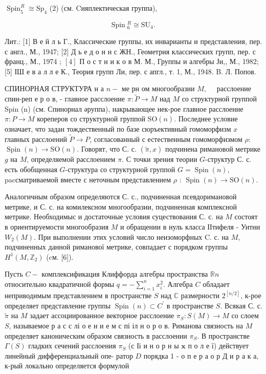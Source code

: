 \documentclass[10pt]{article}
\begin{document}
$\operatorname{Spin}_{5}^{R} \cong \mathrm{Sp}_{4}$ (2) (см. Cияплектическая группа),



\[

\operatorname{Spin}{ }_{6}^{R} \cong \mathrm{SU}_{4} \text {. }

\]



Лит.: [1] В е й л ь Г., Классические группы, их инварианты и представления, пер. с англ., М., 1947; [2] Д ь е д о н н с ЖН., Геометрия классических групп, пер. с франц., М., 1974 ; $[4]$ П о с т н и к о в М. М., Группы и алгебры Ји,, М., 1982; [5] ІШ е в а л л е К., Теория групп Ли, пер. с апгл., т. 1, М., 1948. B. Л. Попов.



СПИНОРНАЯ СТРУКТУРА н а $n-$ ме рн ом многообразии $M, \quad$ расслоение спин-реп е р о в, - главное расслоение $\pi: \tilde{P} \rightarrow M$ над $M$ со структурной группой Spin (n) (см. Спинорнал әруппа), накрывающее нек-рое главное расслоение $\pi: P \rightarrow M$ кореперов со структурной группой $\mathrm{SO}(n)$. Последнее условие означает, что задан тождественный по базе сюръективный гомоморфизм $x$ главных расслоений $\tilde{P} \rightarrow P$, согласованный с естественным гомоморфизмом $\rho:$ $\operatorname{Spin}(n) \rightarrow \mathrm{SO}(n)$. Говорят, что С. с. $(\tilde{\pi}, x)$ подчинена римановой метрике $g$ на $M$, определяемой расслоением $\pi$. С точки зрения теории $G$-структур С. с. есть обобщенная $G$-структура со структурной группой $G=\operatorname{Spin}(n)$, pacсматриваемой вместе с неточным представлением $\rho$ : $\operatorname{Spin}(n) \rightarrow \mathrm{SO}(n)$.



Аналогичным образом определяются С. с., подчиненная псевдоримановой метрике, и С. с. на комилексном многообразии, подчиненная комплексной метрике. Необходимыс и достаточные условия суцествования С. с. на $M$ состоят в ориентируемости многообразия $M$ и обращении в нуль класса ІІтифеля - Уитни $W_{2}(M)$. При выполнении этих условий число неизоморфных C. с. на $M$, подчиненных данной риманової метрике, совпадает с порядком группы $H^{1}\left(M, \mathbb{Z}_{2}\right)$ (cм. [6]).



Пусть $C-$ комплексификация Клиффорда алгебры пространства $\mathbb{R} n$ относительно квадратичной формы $q=-\sum_{i=1}^{n} x_{i}^{2}$. Алгебра $C$ обладает неприводимым представлением в пространстве $S$ над $\mathbb{C}$ размерности $2^{[n / 2]}$, к-рое определяет представление группы $\operatorname{Spin}(n) \subset C^{\prime}$ в пространстве $S$. Всякая С. с. $\tilde{\pi}$ на $M$ задает ассоциированное векторное расслоение $\pi_{S}: S(M) \rightarrow M$ со слоем $S$, называемое р а с с лі о е н и е м с пі іл н о р о в. Риманова связность на $M$ определяет каноническим образом связность в расслоении $\pi_{S}$. В пространстве $\Gamma(S)$ гладких сечений расслоения $\pi_{S}$ (с Іі и н о р н ы $\boldsymbol{x}$ п о л е ї) действует линейный дифференциальный опе- ратор $D$ порядка 1 - о п е р а о р Д и р а к а, к-рый локально определяется формулой
\end{document}
